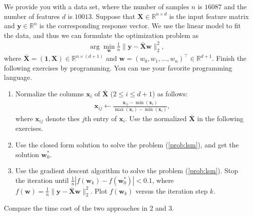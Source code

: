 \documentclass[11pt,letter,notitlepage]{article}
\begin{document}
\begin{exercise}
    We provide you with a data set, where the number of samples $n$ is $16087$ and the number of features $d$ is $10013$. Suppose that $\textbf{X}\in\mathbb{R}^{n\times d}$ is the input feature matrix and $\textbf{y}\in\mathbb{R}^n$ is the corresponding response vector. We use the linear model to fit the data, and thus we can formulate the optimization problem as
    \begin{align}\label{prob:lsm}
        \arg\min_{\textbf{w}} \frac{1}{n}\|\textbf{y}-\bar{\textbf{X}}\textbf{w}\|_2^2,
    \end{align}
    where $\bar{\textbf{X}}=(\textbf{1},\textbf{X})\in\mathbb{R}^{n\times(d+1)}$ and $\textbf{w}=(w_0,w_1,\dots,w_n)^\top\in\mathbb{R}^{d+1}$.
    Finish the following exercises by programming. You can use your favorite programming language.
    \begin{enumerate}
        \item Normalize the columns $\textbf{x}_i$ of $\bar{\textbf{X}}$ ($2\le i\le d+1$) as follows:
              \begin{align*}
                  \textbf{x}_{ij}\leftarrow\frac{\textbf{x}_{ij}-\min (\textbf{x}_i)}{\max (\textbf{x}_i)-\min (\textbf{x}_i)},
              \end{align*}
              where $\textbf{x}_{ij}$ denote thes $j$th entry of $\textbf{x}_i$. Use the normalized $\bar{\textbf{X}}$ in the following exercises.
        \item Use the closed form solution to solve the problem (\ref{prob:lsm}), and get the solution $\textbf{w}_0^*$.
        \item Use the gradient descent algorithm to solve the problem (\ref{prob:lsm}). Stop the iteration until $\frac{1}{n}|f(\textbf{w}_k)-f(\textbf{w}_0^*)|<0.1$, where $f(\textbf{w}) = \frac{1}{n}\|\textbf{y}-\bar{\textbf{X}}\textbf{w} \|_2^2$. Plot $f(\textbf{w}_k)$ versus the iteration step $k$.
    \end{enumerate}
    Compare the time cost of the two approaches in 2 and 3.

\end{exercise}
\end{document}
